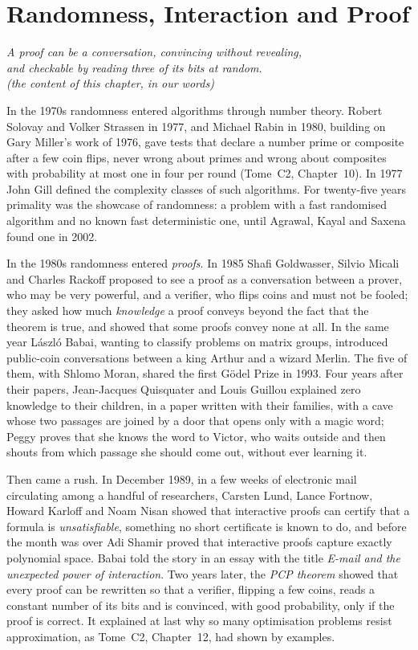\chapter{Randomness, Interaction and Proof}\label{ch:randomness}

\begin{center}\itshape
A proof can be a conversation, convincing without revealing,\\
and checkable by reading three of its bits at random.\\
\upshape(the content of this chapter, in our words)
\end{center}

In the 1970s randomness entered algorithms through number theory. Robert Solovay and Volker Strassen in 1977, and Michael Rabin in 1980, building on Gary Miller's work of 1976, gave tests that declare a number prime or composite after a few coin flips, never wrong about primes and wrong about composites with probability at most one in four per round (Tome~C2, Chapter~10). In 1977 John Gill defined the complexity classes of such algorithms. For twenty-five years primality was the showcase of randomness: a problem with a fast randomised algorithm and no known fast deterministic one, until Agrawal, Kayal and Saxena found one in 2002.

In the 1980s randomness entered \emph{proofs}. In 1985 Shafi Goldwasser, Silvio Micali and Charles Rackoff proposed to see a proof as a conversation between a prover, who may be very powerful, and a verifier, who flips coins and must not be fooled; they asked how much \emph{knowledge} a proof conveys beyond the fact that the theorem is true, and showed that some proofs convey none at all. In the same year László Babai, wanting to classify problems on matrix groups, introduced public-coin conversations between a king Arthur and a wizard Merlin. The five of them, with Shlomo Moran, shared the first Gödel Prize in 1993. Four years after their papers, Jean-Jacques Quisquater and Louis Guillou explained zero knowledge to their children, in a paper written with their families, with a cave whose two passages are joined by a door that opens only with a magic word; Peggy proves that she knows the word to Victor, who waits outside and then shouts from which passage she should come out, without ever learning it.

Then came a rush. In December 1989, in a few weeks of electronic mail circulating among a handful of researchers, Carsten Lund, Lance Fortnow, Howard Karloff and Noam Nisan showed that interactive proofs can certify that a formula is \emph{unsatisfiable}, something no short certificate is known to do, and before the month was over Adi Shamir proved that interactive proofs capture exactly polynomial space. Babai told the story in an essay with the title \emph{E-mail and the unexpected power of interaction}. Two years later, the \emph{PCP theorem} showed that every proof can be rewritten so that a verifier, flipping a few coins, reads a constant number of its bits and is convinced, with good probability, only if the proof is correct. It explained at last why so many optimisation problems resist approximation, as Tome~C2, Chapter~12, had shown by examples.

